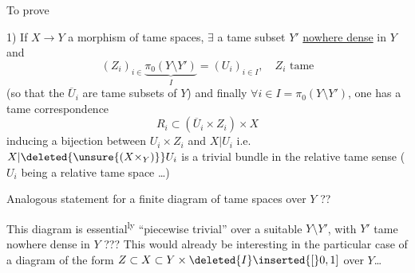 To prove

1) If $X\to Y$ a morphism of tame spaces, $\exists$ a tame subset $Y'$ \uline{nowhere dense} in $Y$ and
\[
(Z_i)_{i\in}\underbrace{\pi_0(Y\setminus Y')}_{I}=(U_i)_{i\in I},\quad Z_i\text{ tame}
\]
(so that the $\overline U_i$ are tame subsets of $Y$) and finally $\forall i\in I=\pi_0(Y\setminus Y')$, one has a tame correspondence
\[
R_i\subset(\overline U_i\times Z_i)\times X
\]
inducing a bijection between $U_i\times Z_i$ and $X|U_i$ i.e. $X|\deleted{\unsure{(X\times_Y)}}U_i$ is a  trivial bundle in the relative tame sense ($U_i$ being a relative tame space \ldots)

Analogous statement for a finite diagram of tame spaces over $Y$ ??

This diagram is essential\textsuperscript{ly} ``piecewise trivial'' over a suitable $Y\setminus Y'$, with $Y'$ tame nowhere dense in $Y$ ??? This would already be interesting in the particular case of a diagram of the form $Z\subset X\subset Y\times\deleted{I}\inserted{[}0,1]$ \deleted{$\unsure{(I\subset[0,}$} over $Y$\ldots

